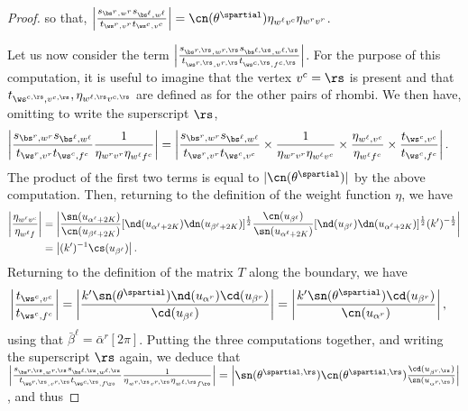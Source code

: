 \documentclass[a4paper,twoside,11pt]{article}
\begin{document}
\begin{proof}
so that, $\left|\frac{s_{\bs^r,w^r}s_{\bs^\ell,w^\ell} }{t_{\ws^r,v^r}t_{\ws^c,v^c}}\right|=\cn(\theta^\spartial)\eta_{w^\ell v^c}\eta_{w^r v^r}$.

Let us now consider the term $\Bigl|\frac{s_{\bs^{r,\rs},w^{r,\rs}}s_{\bs^{\ell,\rs},w^{\ell,\rs}}}{
t_{\ws^{r,\rs},v^{r,\rs}}t_{\ws^{c,\rs},f^{c,\rs}}}\Bigr|$. For the purpose of this computation, it is useful to imagine that the vertex 
$v^c=\rs$ is present
and that $t_{\ws^{c,\rs},v^{c,\rs}}, \eta_{w^{\ell,\rs} v^{c,\rs}}$ are defined as for the other pairs of rhombi. We then have, omitting to write the superscript
$\rs$,
\begin{align*}
\left|\frac{s_{\bs^r,w^r}s_{\bs^\ell,w^\ell}}{
t_{\ws^r,v^r}t_{\ws^c,f^c}}\frac{1}{\eta_{w^r v^r}\eta_{w^\ell f^c}}\right|&=
\left|\frac{s_{\bs^r,w^r}s_{\bs^\ell,w^\ell} }{t_{\ws^r,v^r}t_{\ws^c,v^c}}
\times \frac{1}{\eta_{w^r v^r}\eta_{w^\ell v^c}}\times\frac{\eta_{w^\ell,v^c}}{\eta_{w^\ell f^c}}\times\frac{t_{\ws^c,v^c}}{t_{\ws^c,f^c}}\right|.
\end{align*}
The product of the first two terms is equal to $|\cn(\theta^\spartial)|$ by the above computation. Then, returning to the definition of 
the weight function $\eta$, we have
\begin{align*}
\left|\frac{\eta_{w^\ell v^c}}{\eta_{w^\ell f}}\right|&=\left|
\frac{\sn(u_{\alpha^\ell+2K})}{\cn(u_{\beta^\ell+2K})}[\nd(u_{\alpha^\ell+2K})\dn(u_{\beta^\ell+2K})]^\frac{1}{2}
\frac{\cn(u_{\beta^\ell})}{\sn(u_{\alpha^\ell+2K})}[\nd(u_{\beta^\ell})\dn(u_{\alpha^\ell+2K})]^\frac{1}{2}(k')^{-\frac{1}{2}}
\right|\\
&=\left|(k')^{-1}\cs(u_{\beta^\ell})\right|.
\end{align*}
Returning to the definition of the matrix $T$ along the boundary, we have
\begin{align*}
\left|\frac{t_{\ws^c,v^c}}{t_{\ws^c,f^c}}\right|&=\left|
\frac{k'\sn(\theta^\spartial)\nd(u_{\alpha^r})\cd(u_{\beta^r})}{\cd(u_{\beta^\ell})}\right|=\left|\frac{k'\sn(\theta^\spartial)\cd(u_{\beta^r})
}{\cn(u_{\alpha^r})}\right|,
\end{align*}
using that $\bar{\beta}^\ell=\bar{\alpha}^r[2\pi]$. Putting the three computations together, and writing the superscript $\rs$ again, we deduce that 
$\left|\frac{s_{\bs^{r,\rs},w^{r,\rs}}s_{\bs^{\ell,\rs},w^{\ell,\rs}}}{
t_{\ws^{r,\rs},v^{r,\rs}}t_{\ws^{c,\rs},f\ro}}\frac{1}{\eta_{w^{r,\rs} v^{r,\rs}}\eta_{w^{\ell,\rs} f\ro}}\right|=
\left|\sn(\theta^{\spartial,\rs})\cn(\theta^{\spartial,\rs})\frac{\cd(u_{\beta^{r,\rs}})}{\sn(u_{\alpha^{r,\rs}})}\right|$, and thus

\end{proof}
\end{document}
